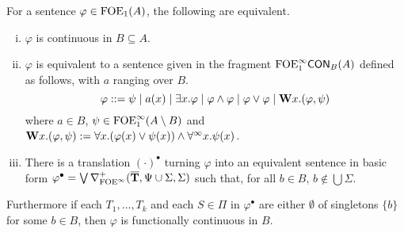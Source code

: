 \begin{theorem}\label{cor:ofoeicontinuousnf} For a sentence $\varphi \in \ofoe(A)$, the following are equivalent.
\begin{enumerate}[(i)]
\item $\varphi$ is continuous in $B \subseteq A$.
\item $\varphi$ is equivalent to a sentence given in the fragment $\cont{\ofoei}{B}(A)$ defined as follows, with $a$ ranging over $B$.
\[
\varphi ::= \psi \mid a(x) \mid \exists x.\varphi \mid \varphi \land \varphi \mid \varphi \lor \varphi \mid \wqu x.(\varphi,\psi)
\]
where $a\in B$, $\psi \in \ofoei(A\setminus B)$ and $\wqu x.(\varphi,\psi) \df \forall x.(\varphi(x) \lor \psi(x)) \land \dqu x.\psi(x)$.
\item There is a translation $(\cdot)^{\bullet}$ turning $\varphi$ into an equivalent sentence in basic form $\varphi^{\bullet} = \bigvee \mondbnfofoei{\vlist{T}}{\Psi \cup \Sigma}{\Sigma}{+}$ such that, for all $b \in B$, $b\notin \bigcup\Sigma$.
\end{enumerate}
Furthermore if each $T_1, \dots, T_k$ and each $S \in \Pi$ in $\varphi^{\bullet}$ are either $\emptyset$ of singletons $\{b\}$ for some $b \in B$, then $\varphi$ is functionally continuous in $B$.
\end{theorem}




